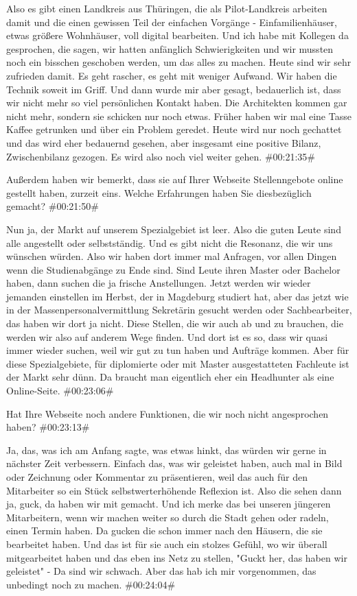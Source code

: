 \begin{description}
\Andre Also es gibt einen Landkreis aus Thüringen, die als Pilot-Landkreis arbeiten damit und die einen gewissen Teil der einfachen Vorgänge - Einfamilienhäuser, etwas größere Wohnhäuser, voll digital bearbeiten. Und ich habe mit Kollegen da gesprochen, die sagen, wir hatten anfänglich Schwierigkeiten und wir mussten noch ein bisschen geschoben werden, um das alles zu machen. Heute sind wir sehr zufrieden damit. Es geht rascher, es geht mit weniger Aufwand. Wir haben die Technik soweit im Griff. Und dann wurde mir aber gesagt, bedauerlich ist, dass wir nicht mehr so viel persönlichen Kontakt haben. Die Architekten kommen gar nicht mehr, sondern sie schicken nur noch etwas. Früher haben wir mal eine Tasse Kaffee getrunken und über ein Problem geredet. Heute wird nur noch gechattet und das wird eher bedauernd gesehen, aber insgesamt eine positive Bilanz, Zwischenbilanz gezogen. Es wird also noch viel weiter gehen. \#00:21:35\#

\Fabian Außerdem haben wir bemerkt, dass sie auf Ihrer Webseite Stellenngebote online gestellt haben, zurzeit eins. Welche Erfahrungen haben Sie diesbezüglich gemacht? \#00:21:50\#

\Andre Nun ja, der Markt auf unserem Spezialgebiet ist leer. Also die guten Leute sind alle angestellt oder selbstständig. Und es gibt nicht die Resonanz, die wir uns wünschen würden. Also wir haben dort immer mal Anfragen, vor allen Dingen wenn die Studienabgänge zu Ende sind. Sind Leute ihren Master oder Bachelor haben, dann suchen die ja frische Anstellungen. Jetzt werden wir wieder jemanden einstellen im Herbst, der in Magdeburg studiert hat, aber das jetzt wie in der Massenpersonalvermittlung Sekretärin gesucht werden oder Sachbearbeiter, das haben wir dort ja nicht. Diese Stellen, die wir auch ab und zu brauchen, die werden wir also auf anderem Wege finden. Und dort ist es so, dass wir quasi immer wieder suchen, weil wir gut zu tun haben und Aufträge kommen. Aber für diese Spezialgebiete, für diplomierte oder mit Master ausgestatteten Fachleute ist der Markt sehr dünn. Da braucht man eigentlich eher ein Headhunter als eine Online-Seite. \#00:23:06\#

\Fabian Hat Ihre Webseite noch andere Funktionen, die wir noch nicht angesprochen haben? \#00:23:13\#

\Andre Ja, das, was ich am Anfang sagte, was etwas hinkt, das würden wir gerne in nächster Zeit verbessern. Einfach das, was wir geleistet haben, auch mal in Bild oder Zeichnung oder Kommentar zu präsentieren, weil das auch für den Mitarbeiter so ein Stück selbstwerterhöhende Reflexion ist. Also die sehen dann ja, guck, da haben wir mit gemacht. Und ich merke das bei unseren jüngeren Mitarbeitern, wenn wir machen weiter so durch die Stadt gehen oder radeln, einen Termin haben. Da gucken die schon immer nach den Häusern, die sie bearbeitet haben. Und das ist für sie auch ein stolzes Gefühl, wo wir überall mitgearbeitet haben und das eben ins Netz zu stellen, "Guckt her, das haben wir geleistet" - Da sind wir schwach. Aber das hab ich mir vorgenommen, das unbedingt noch zu machen. \#00:24:04\#


\end{description}
